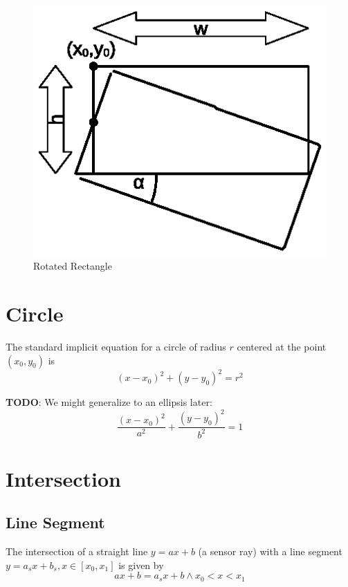 \documentclass[11pt]{article}
\newcommand{\TODO}{{\bf TODO}}
\begin{document}
\begin{figure}
    \centering
    \includegraphics[trim=10 40 10 20]{rectangle.eps}
    \caption{Rotated Rectangle}\label{fig-rectangle}
\end{figure}

\section{Circle}
\label{sec-circle}

The standard implicit equation for a circle of radius $r$  centered at the 
point $(x_0, y_0)$ is
\begin{equation}
    (x - x_0)^2 + (y - y_0)^2 = r^2 
\end{equation}

\TODO: We might generalize to an ellipsis later:
\begin{equation}
    \frac{(x-x_0)^2}{a^2} + \frac{(y-y_0)^2}{b^2} = 1
\end{equation}

\section{Intersection}
\label{sec-intersection}

\subsection{Line Segment}
\label{sec-intersection-line-segment}
The intersection of a straight line $y=ax+b$ (a sensor ray) with a line segment
$y = a_s x + b_s, x\in[x_0, x_1]$ is given by 
\begin{equation}
    ax+b = a_sx+b \land x_0 < x < x_1
\end{equation}
\end{document}
